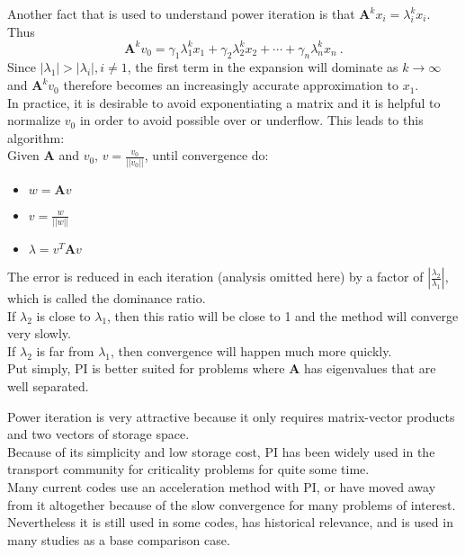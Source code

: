 \documentclass[12pt]{article}
\newcommand{\ve}[1]{\ensuremath{\mathbf{#1}}}
\begin{document}
Another fact that is used to understand power iteration is that $\ve{A}^k x_i = \lambda_i^k x_i$. Thus
%
\begin{equation}
  \ve{A}^k v_{0} = \gamma_1 \lambda_1^k x_1 + \gamma_2 \lambda_2^k x_2 + \cdots + \gamma_n \lambda_n^k x_n \:.
  \label{eq:Ak}
\end{equation}
%
Since $|\lambda_1| > |\lambda_i|, i \ne 1$, the first term in the expansion will dominate as $k \to \infty$ and $\ve{A}^k v_{0}$ therefore becomes an increasingly accurate approximation to $x_1$.\\ 
In practice, it is desirable to avoid exponentiating a matrix and it is helpful to normalize $v_0$ in order to avoid possible over or underflow. This leads to this algorithm:\\
Given $\ve{A}$ and $v_0$, $v = \frac{v_{0}}{||v_{0}||}$, until convergence do:
\begin{itemize}
    \item $w = \ve{A}v$
    \item $v = \frac{w}{||w||}$
    \item $\lambda = v^{T}\ve{A}v$
\end{itemize}
%
The error is reduced in each iteration (analysis omitted here) by a factor of $|\frac{\lambda_{2}}{\lambda_{1}}|$, which is called the dominance ratio. \\
If $\lambda_2$ is close to $\lambda_1$, then this ratio will be close to 1 and the method will converge very slowly. \\
If $\lambda_2$ is far from $\lambda_1$, then convergence will happen much more quickly. \\
Put simply, PI is better suited for problems where $\ve{A}$ has eigenvalues that are well separated.

Power iteration is very attractive because it only requires matrix-vector products and two vectors of storage space. \\
Because of its simplicity and low storage cost, PI has been widely used in the transport community for criticality problems for quite some time. \\
Many current codes use an acceleration method with PI, or have moved away from it altogether because of the slow convergence for many problems of interest. \\
Nevertheless it is still used in some codes, has historical relevance, and is used in many studies as a base comparison case. 
\end{document}
